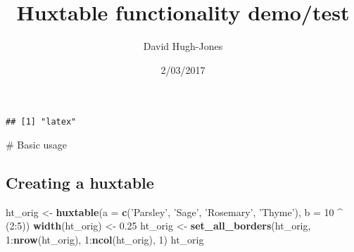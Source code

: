\documentclass[]{article}
\title{Huxtable functionality demo/test}
\author{David Hugh-Jones}
\date{2/03/2017}
\newenvironment{Shaded}{\begin{snugshade}}{\end{snugshade}}
\newcommand{\KeywordTok}[1]{\textcolor[rgb]{0.13,0.29,0.53}{\textbf{{#1}}}}
\newcommand{\DataTypeTok}[1]{\textcolor[rgb]{0.13,0.29,0.53}{{#1}}}
\newcommand{\DecValTok}[1]{\textcolor[rgb]{0.00,0.00,0.81}{{#1}}}
\newcommand{\FloatTok}[1]{\textcolor[rgb]{0.00,0.00,0.81}{{#1}}}
\newcommand{\StringTok}[1]{\textcolor[rgb]{0.31,0.60,0.02}{{#1}}}
\newcommand{\NormalTok}[1]{{#1}}
\begin{document}
\maketitle

\begin{Shaded}
\end{Shaded}

\begin{verbatim}
## [1] "latex"
\end{verbatim}

\FloatBarrier
\# Basic usage

\subsection{Creating a huxtable}\label{creating-a-huxtable}

\begin{Shaded}
\begin{Highlighting}[]
\NormalTok{ht_orig <-}\StringTok{ }\KeywordTok{huxtable}\NormalTok{(}\DataTypeTok{a =} \KeywordTok{c}\NormalTok{(}\StringTok{'Parsley'}\NormalTok{, }\StringTok{'Sage'}\NormalTok{, }\StringTok{'Rosemary'}\NormalTok{, }\StringTok{'Thyme'}\NormalTok{), }\DataTypeTok{b =} \DecValTok{10} \NormalTok{^}\StringTok{ }\NormalTok{(}\DecValTok{2}\NormalTok{:}\DecValTok{5}\NormalTok{)) }
\KeywordTok{width}\NormalTok{(ht_orig) <-}\StringTok{ }\FloatTok{0.25}
\NormalTok{ht_orig <-}\StringTok{ }\KeywordTok{set_all_borders}\NormalTok{(ht_orig, }\DecValTok{1}\NormalTok{:}\KeywordTok{nrow}\NormalTok{(ht_orig), }\DecValTok{1}\NormalTok{:}\KeywordTok{ncol}\NormalTok{(ht_orig), }\DecValTok{1}\NormalTok{)}
\NormalTok{ht_orig}
\end{Highlighting}
\end{Shaded}
\end{document}
